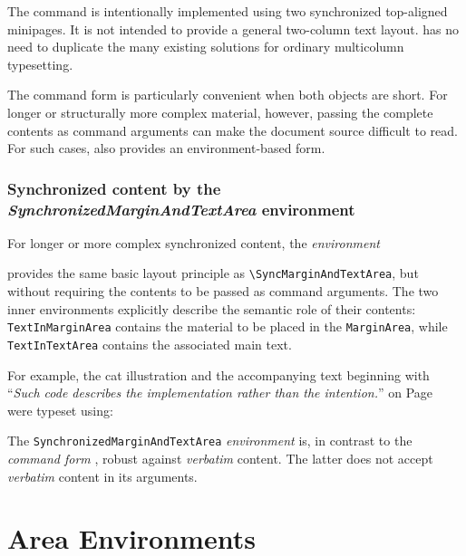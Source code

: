 \documentclass[
11pt,
a4paper,
oneside
]{scrbook}
\begin{document}
\vspace{2ex}

\noindent
The command is intentionally implemented using two synchronized
top-aligned minipages. It is not intended to provide a general
two-column text layout. \MDWordmark has no need to duplicate the many
existing solutions for ordinary multicolumn typesetting.

The command form is particularly convenient when both objects are
short. For longer or structurally more complex material, however,
passing the complete contents as command arguments can make the
document source difficult to read. For such cases, \MDWordmark also
provides an environment-based form.

\subsection{Synchronized content by the \emph{SynchronizedMarginAndTextArea} environment}

For longer or more complex synchronized content, the \emph{environment}




provides the same basic layout principle as
\texttt{\textbackslash{}SyncMarginAndTextArea}, but without requiring the
contents to be passed as command arguments.
The two inner environments explicitly describe the semantic role of
their contents: \texttt{TextInMarginArea} contains the material to be
placed in the \texttt{MarginArea}, while \texttt{TextInTextArea}
contains the associated main text.

For example, the cat illustration and the accompanying text beginning
with ``\emph{Such code describes the implementation rather than the
	intention.}'' on Page~ were
typeset using:




\begin{note}
	The \texttt{SynchronizedMarginAndTextArea} \emph{environment} is, in contrast to
	the \emph{command form} , robust against
	\emph{verbatim} content.
	The latter does not accept \emph{verbatim} content in its arguments.
\end{note}


\chapter{Area Environments}
\label{chap:area-environments}
\end{document}
